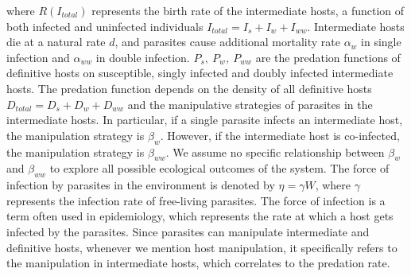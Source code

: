 \documentclass[a4paper]{scrartcl}
\begin{document}
%
where $R(I_{total})$ represents the birth rate of the intermediate hosts, a function of both infected and uninfected individuals $I_{total} = I_s + I_w + I_{ww}$.
Intermediate hosts die at a natural rate $d$, and parasites cause additional mortality rate $\alpha_w$ in single infection and $\alpha_{ww}$ in double infection.
$P_s, \ P_w, \ P_{ww}$ are the predation functions of definitive hosts on susceptible, singly infected and doubly infected intermediate hosts. 
The predation function depends on the density of all definitive hosts $D_{total} = D_s + D_w + D_{ww}$ and the manipulative strategies of parasites in the intermediate hosts. 
In particular, if a single parasite infects an intermediate host, the manipulation strategy is $\beta_w$. 
However, if the intermediate host is co-infected, the manipulation strategy is $\beta_{ww}$. 
We assume no specific relationship between $\beta_w$ and $\beta_{ww}$ to explore all possible ecological outcomes of the system. 
The force of infection by parasites in the environment is denoted by $\eta = \gamma W$, where $\gamma$ represents the infection rate of free-living parasites. 
The force of infection is a term often used in epidemiology, which represents the rate at which a host gets infected by the parasites.
Since parasites can manipulate intermediate and definitive hosts, whenever we mention host manipulation, it specifically refers to the manipulation in intermediate hosts, which correlates to the predation rate.
\end{document}
